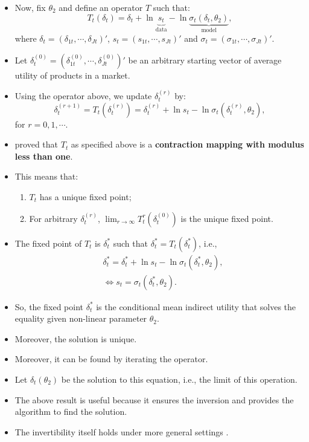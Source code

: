 \documentclass[
]{book}
\providecommand{\tightlist}{%
  \setlength{\itemsep}{0pt}\setlength{\parskip}{0pt}}
\begin{document}
\begin{itemize}
\tightlist
\item
  Now, fix \(\theta_2\) and define an operator \(T\) such that:
  \begin{equation}
  T_t(\delta_t) = \delta_t + \ln \underbrace{s_{t}}_{\text{data}} - \ln \underbrace{\sigma_{t}(\delta_t, \theta_2)}_{\text{model}},
  \end{equation}
  where \(\delta_t = (\delta_{1t}, \cdots, \delta_{Jt})'\), \(s_t = (s_{1t}, \cdots, s_{Jt})'\) and \(\sigma_t = (\sigma_{1t}, \cdots, \sigma_{Jt})'\).
\item
  Let \(\delta_t^{(0)} = (\delta_{1t}^{(0)}, \cdots, \delta_{Jt}^{(0)})'\) be an arbitrary starting vector of average utility of products in a market.
\item
  Using the operator above, we update \(\delta_{t}^{(r)}\) by:
  \begin{equation}
  \delta_{t}^{(r + 1)} = T_t(\delta_{t}^{(r)}) = \delta_t^{(r)} + \ln s_{t} - \ln \sigma_{t}(\delta_t^{(r)}, \theta_2),
  \end{equation}
  for \(r = 0, 1, \cdots\).
\item
  \citet{Berry1995a} proved that \(T_t\) as specified above is a \textbf{contraction mapping with modulus less than one}.
\item
  This means that:

  \begin{enumerate}
  \def\labelenumi{\arabic{enumi}.}
  \tightlist
  \item
    \(T_t\) has a unique fixed point;
  \item
    For arbitrary \(\delta_t^{(r)}\), \(\lim_{r \to \infty} T_t^r(\delta_t^{(0)})\) is the unique fixed point.
  \end{enumerate}
\item
  The fixed point of \(T_t\) is \(\delta_t^*\) such that \(\delta_t^* = T_t(\delta_t^*)\), i.e.,
  \begin{equation}
  \begin{split}
  &\delta_t^* = \delta_t^* + \ln s_{t} - \ln \sigma_{t}(\delta_t^*, \theta_2),\\
  &\Leftrightarrow s_{t} = \sigma_{t}(\delta_t^*, \theta_2).
  \end{split}
  \end{equation}
\item
  So, the fixed point \(\delta_t^*\) is the conditional mean indirect utility that solves the equality given non-linear parameter \(\theta_2\).
\item
  Moreover, the solution is unique.
\item
  Moreover, it can be found by iterating the operator.
\item
  Let \(\delta_t(\theta_2)\) be the solution to this equation, i.e., the limit of this operation.
\item
  The above result is useful because it ensures the inversion and provides the algorithm to find the solution.
\item
  The invertibility itself holds under more general settings \citep{Berry2013}.
\end{itemize}
\end{document}
